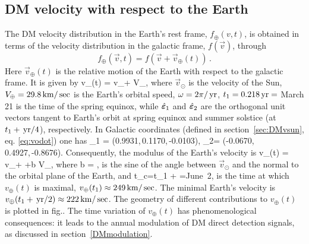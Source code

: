 

\subsection{DM velocity with respect to the Earth}\label{sec:DM:velocity:Earth}\label{Velocity distribution!with respect to the Earth}
The DM velocity distribution in the Earth's rest frame, $f_\oplus(v,t)$, is obtained in terms of the velocity distribution in the galactic frame, $ f(\vec v)$, through
\begin{equation}
\label{eq:fearth}
f_\oplus(\vec v,t) = f(\vec v+\vec v_\oplus(t))\,.
\end{equation}
Here $\vec v_\oplus(t)$ is the relative motion of the Earth with respect to the galactic frame.
It is given by
\beq \vec v_\oplus(t) = \vec v_\odot + V_\oplus {},
\eeq
where
$\vec v_\odot $ is the velocity of the Sun,
$V_\oplus = 29.8\,{\rm km}/\sec$ is the Earth's orbital speed, $\omega=2\pi/\,{\rm yr}$,
$t_1 = 0.218\,{\rm yr} = $ March 21 is the time of the
spring equinox, while
$ \hat{\bm{\varepsilon}}_1 $ and $ \hat{\bm{\varepsilon}}_2$ are the orthogonal unit vectors tangent to Earth's orbit 
 at spring equinox and summer solstice
(at $t_1 + \,{\rm yr}/4$), respectively.
In Galactic coordinates (defined in section~\ref{sec:DMvsun}, eq. \eqref{eq:vodot}) one has
\beq
\hat{\mb{\varepsilon}}_1 = (\phantom{-}0.9931,\,0.1170,\,-0.0103),\qquad
\hat{\mb{\varepsilon}}_2= (-0.0670,\,0.4927,\,-0.8676).
\eeq
Consequently, the modulus of the Earth's velocity is
\beq 
\label{eq:voplus:time}
v_\oplus(t) = 
\simeq
v_\odot + +b V_\oplus \cos[\omega(t-t_c)],
\eeq
where
\beq b = ,
\eeq
is the sine of the angle between $\vec v_\odot$ and the normal to the orbital plane of the Earth,
and
\beq
t_c=t_1 + \arctan{}\yr=\hbox{June 2},
\eeq
is the time at which $v_\oplus(t)$ is maximal, $v_\oplus(t_1) \approx 249\,{\rm km}/\sec$.
The minimal Earth's velocity is $v_\oplus(t_1 + \,{\rm yr}/2)\approx 222\,{\rm km}/\sec$.
The geometry of different contributions to $v_\oplus(t) $  is plotted in fig..
The time variation of $v_\oplus(t)$ has phenomenological consequences: it leads to the annual modulation of DM direct detection signals, as discussed in section~\ref{DMmodulation}.



